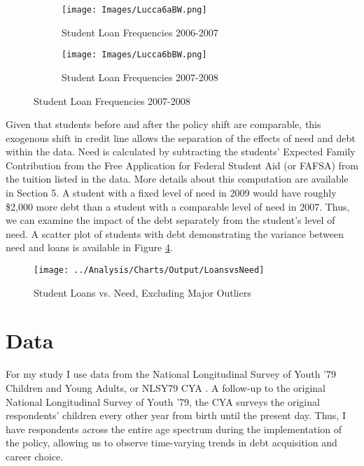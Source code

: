 \documentclass[12pt]{article}
\begin{document}
	\begin{figure}
	\centering
	\caption{Student Loan Frequencies From NY Fed CCP/Equifax Panel as Presented in \textcite{lucca2018}}
	\label{luc}
	\begin{subfigure}{0.49\textwidth}
		\centering
		\caption{Student Loan Frequencies 2006-2007}
		\label{luc06}
		\texttt{[image: Images/Lucca6aBW.png]}
	\end{subfigure} 
	\begin{subfigure}{0.49\textwidth}
		\centering
		\caption{Student Loan Frequencies 2007-2008}
		\label{luc07}
		\texttt{[image: Images/Lucca6bBW.png]}
	\end{subfigure}
	\end{figure}

	
	Given that students before and after the policy shift are comparable, this exogenous shift in credit line allows the separation of the effects of need and debt within the data. Need is calculated by subtracting the students' Expected Family Contribution from the Free Application for Federal Student Aid (or FAFSA) from the tuition listed in the data. More details about this computation are available in Section 5. A student with a fixed level of need in 2009 would have roughly \$2,000 more debt than a student with a comparable level of need in 2007. Thus, we can examine the impact of the debt separately from the student's level of need. A scatter plot of students with debt demonstrating the variance between need and loans is available in Figure \ref{needvloans}.
	
	\begin{figure}
		\centering
		\caption{Student Loans vs. Need, Excluding Major Outliers}
		\label{needvloans}
		\texttt{[image: ../Analysis/Charts/Output/LoansvsNeed]}
	\end{figure}
	
	
	\section{Data}
	
	For my study I use data from the National Longitudinal Survey of Youth '79 Children and Young Adults, or NLSY79 CYA \parencite{bls2018}. A follow-up to the original National Longitudinal Survey of Youth '79, the CYA surveys the original respondents' children every other year from birth until the present day. Thus, I have respondents across the entire age spectrum during the implementation of the policy, allowing us to observe time-varying trends in debt acquisition and career choice. 
	
\end{document}
